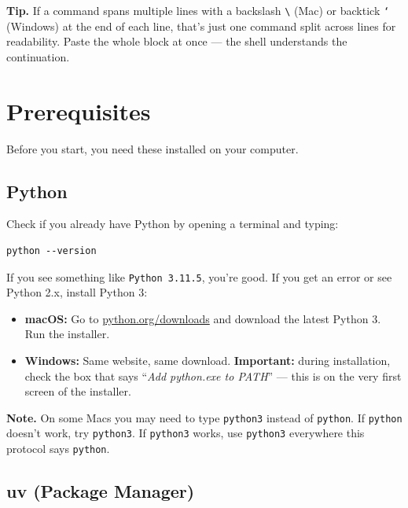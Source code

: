 \documentclass[11pt]{article}
\newcommand{\code}[1]{\texttt{#1}}
\begin{document}
\begin{tipbox}
\textbf{Tip.} If a command spans multiple lines with a backslash
\code{\textbackslash} (Mac) or backtick \code{`} (Windows) at the end
of each line, that's just one command split across lines for
readability. Paste the whole block at once --- the shell understands
the continuation.
\end{tipbox}

\section{Prerequisites}

Before you start, you need these installed on your computer.

\subsection{Python}

Check if you already have Python by opening a terminal and typing:

\begin{lstlisting}
python --version
\end{lstlisting}

If you see something like \code{Python 3.11.5}, you're good. If you
get an error or see Python 2.x, install Python 3:

\begin{itemize}[leftmargin=*]
    \item \textbf{macOS:} Go to
    \href{https://www.python.org/downloads/}{python.org/downloads}
    and download the latest Python 3. Run the installer.
    \item \textbf{Windows:} Same website, same download.
    \textbf{Important:} during installation, check the box that says
    ``\emph{Add python.exe to PATH}'' --- this is on the very first
    screen of the installer.
\end{itemize}

\begin{notebox}
\textbf{Note.} On some Macs you may need to type \code{python3} instead
of \code{python}. If \code{python} doesn't work, try \code{python3}. If
\code{python3} works, use \code{python3} everywhere this protocol says
\code{python}.
\end{notebox}

\subsection{uv (Package Manager)}
\end{document}
